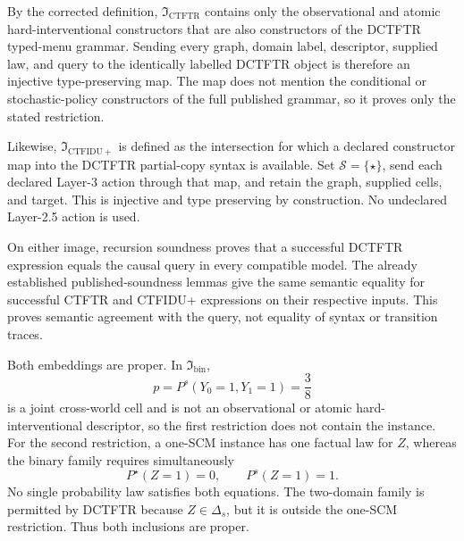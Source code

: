 By the corrected definition, \(\mathfrak I_{\mathrm{CTFTR}}\) contains only the observational and atomic hard-interventional constructors that are also constructors of the DCTFTR typed-menu grammar.  Sending every graph, domain label, descriptor, supplied law, and query to the identically labelled DCTFTR object is therefore an injective type-preserving map.  The map does not mention the conditional or stochastic-policy constructors of the full published grammar, so it proves only the stated restriction.

Likewise, \(\mathfrak I_{\mathrm{CTFIDU+}}\) is defined as the intersection for which a declared constructor map into the DCTFTR partial-copy syntax is available.  Set \(\mathcal S=\{\star\}\), send each declared Layer-3 action through that map, and retain the graph, supplied cells, and target.  This is injective and type preserving by construction.  No undeclared Layer-2.5 action is used.

On either image, recursion soundness proves that a successful DCTFTR expression equals the causal query in every compatible model.  The already established published-soundness lemmas give the same semantic equality for successful CTFTR and CTFIDU+ expressions on their respective inputs.  This proves semantic agreement with the query, not equality of syntax or transition traces.

Both embeddings are proper.  In \(\mathfrak I_{\mathrm{bin}}\),
\[
p=P^s(Y_0=1,Y_1=1)=\frac38
\]
is a joint cross-world cell and is not an observational or atomic hard-interventional descriptor, so the first restriction does not contain the instance.  For the second restriction, a one-SCM instance has one factual law for \(Z\), whereas the binary family requires simultaneously
\[
P^\star(Z=1)=0,
\qquad
P^s(Z=1)=1.
\]
No single probability law satisfies both equations.  The two-domain family is permitted by DCTFTR because \(Z\in\Delta_s\), but it is outside the one-SCM restriction.  Thus both inclusions are proper.